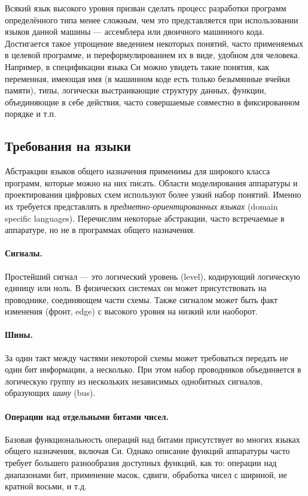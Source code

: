 Всякий язык высокого уровня призван сделать процесс разработки программ определённого типа менее сложным, чем это представляется при использовании языков данной машины — ассемблера или двоичного машинного кода. Достигается такое упрощение введением некоторых понятий, часто применяемых в целевой программе, и переформулированием их в виде, удобном для человека. Например, в спецификации языка Си можно увидеть такие понятия, как переменная, имеющая имя (в машинном коде есть только безымянные ячейки памяти), типы, логически выстраивающие структуру данных, функции, объединяющие в себе действия, часто совершаемые совместно в фиксированном порядке и т.п. 

\subsection{Требования на языки}

Абстракции языков общего назначения применимы для широкого класса программ, которые можно на них писать. Области моделирования аппаратуры и проектирования цифровых схем используют более узкий набор понятий. Именно их требуется представлять в \emph{предметно-ориентированных языках} (\abbr domain specific languages). Перечислим некоторые абстракции, часто встречаемые в аппаратуре, но не в программах общего назначения. 

\paragraph{Сигналы.} Простейший сигнал — это логический уровень (\abbr level), кодирующий логическую единицу или ноль. В физических системах он может присутствовать на проводнике, соединяющем части схемы. Также сигналом может быть факт изменения (фронт, \abbr edge) с высокого уровня на низкий или наоборот.

\paragraph{Шины.} За один такт между частями некоторой схемы может требоваться передать не один бит информации, а несколько. При этом набор проводников объединяется в логическую группу из нескольких независимых однобитных сигналов, образующих \emph{шину} (\abbr bus).

\paragraph{Операции над отдельными битами чисел.} Базовая функциональность операций над битами присутствует во многих языках общего назначения, включая Си. Однако описание функций аппаратуры часто требует большего разнообразия доступных функций, как то: операции над диапазонами бит, применение масок, сдвиги, обработка чисел с шириной, не кратной восьми, и т.д.

